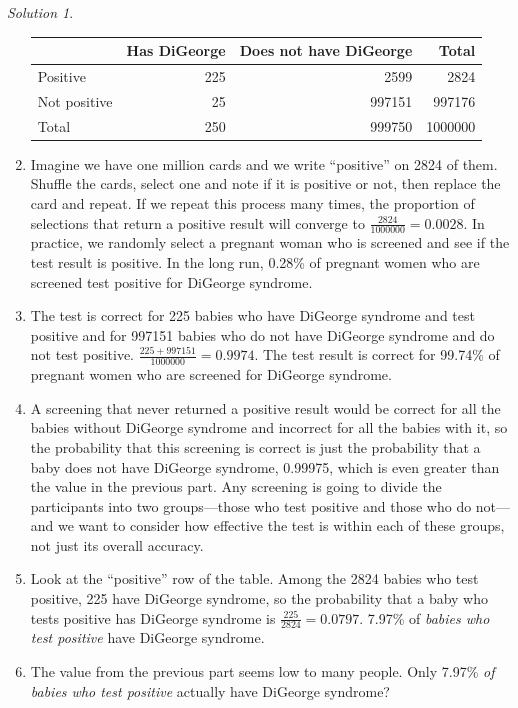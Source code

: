 \documentclass[
  letterpaper,
  DIV=11,
  numbers=noendperiod]{scrreprt}
\theoremstyle{plain}
\theoremstyle{definition}
\theoremstyle{definition}
\theoremstyle{definition}
\theoremstyle{remark}
\newtheorem{refsolution}{Solution}[chapter]
\begin{document}
\begin{tcolorbox}
\begin{refsolution}
\begin{enumerate}
  \begin{longtable}[]{@{}lrrr@{}}
  \toprule\noalign{}
  & Has DiGeorge & Does not have DiGeorge & Total \\
  \midrule\noalign{}
  \endhead
  \bottomrule\noalign{}
  \endlastfoot
  Positive & 225 & 2599 & 2824 \\
  Not positive & 25 & 997151 & 997176 \\
  Total & 250 & 999750 & 1000000 \\
  \end{longtable}
\item
  Imagine we have one million cards and we write ``positive'' on 2824 of
  them. Shuffle the cards, select one and note if it is positive or not,
  then replace the card and repeat. If we repeat this process many
  times, the proportion of selections that return a positive result will
  converge to \(\frac{2824}{1000000} = 0.0028\). In practice, we
  randomly select a pregnant woman who is screened and see if the test
  result is positive. In the long run, 0.28\% of pregnant women who are
  screened test positive for DiGeorge syndrome.
\item
  The test is correct for 225 babies who have DiGeorge syndrome and test
  positive and for 997151 babies who do not have DiGeorge syndrome and
  do not test positive. \(\frac{225 + 997151}{1000000} = 0.9974\). The
  test result is correct for 99.74\% of pregnant women who are screened
  for DiGeorge syndrome.
\item
  A screening that never returned a positive result would be correct for
  all the babies without DiGeorge syndrome and incorrect for all the
  babies with it, so the probability that this screening is correct is
  just the probability that a baby does not have DiGeorge syndrome,
  0.99975, which is even greater than the value in the previous part.
  Any screening is going to divide the participants into two
  groups---those who test positive and those who do not---and we want to
  consider how effective the test is within each of these groups, not
  just its overall accuracy.
\item
  Look at the ``positive'' row of the table. Among the 2824 babies who
  test positive, 225 have DiGeorge syndrome, so the probability that a
  baby who tests positive has DiGeorge syndrome is
  \(\frac{225}{2824} = 0.0797\). 7.97\% of \emph{babies who test
  positive} have DiGeorge syndrome.
\item
  The value from the previous part seems low to many people. Only 7.97\%
  \emph{of babies who test positive} actually have DiGeorge syndrome?

\end{enumerate}
\end{refsolution}
\end{tcolorbox}
\end{document}
